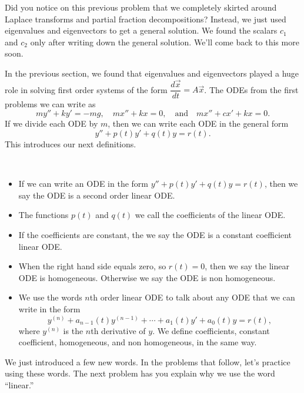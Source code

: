 Did you notice on this previous problem that we  completely skirted around Laplace transforms and partial fraction decompositions?  Instead, we just used eigenvalues and eigenvectors to get a general solution. We found the scalars $c_1$ and $c_2$ only after writing down the general solution. We'll come back to this more soon. 
















\mysubsection{\ideaD}

In the previous section, we found that eigenvalues and eigenvectors played a huge role in solving first order systems of the form 
$\dfrac{d\vec{x}}{dt} =A\vec x$. 
The ODEs from the first problems we can write as
$$my''+ky'=-mg,
\quad mx''+kx=0,
\quad \text{and}\quad mx''+cx'+kx=0.$$
If we divide each ODE by $m$, then we can write each ODE in the general form 
$$y''+p(t) y'+q(t)y=r(t).$$
This introduces our next definitions.
\begin{definition}
\
\begin{itemize}
 \item If we can write an ODE in the form  $y''+p(t)y'+q(t)y=r(t)$, then we say the ODE is a second order linear ODE. 
 \item The functions $p(t)$ and $q(t)$ we call the coefficients of the linear ODE.
 \item If the coefficients are constant, the we say the ODE is a constant coefficient linear ODE.   
 \item When the right hand side equals zero, so $r(t)=0$, then we say the linear ODE is homogeneous. Otherwise we say the ODE is non homogeneous.
 \item We use the words $n$th order linear ODE to talk about any ODE that we can write in the form $$y^{(n)}+a_{n-1}(t)y^{(n-1)} + \cdots + a_1(t)y'+a_0(t)y=r(t),$$ where $y^{(n)}$ is the $n$th derivative of $y$. We define coefficients, constant coefficient, homogeneous, and non homogeneous, in the same way.
\end{itemize}
\end{definition}


We just introduced a few new words. In the problems that follow, let's practice using these words. The next problem has you explain why we use the word ``linear.''


